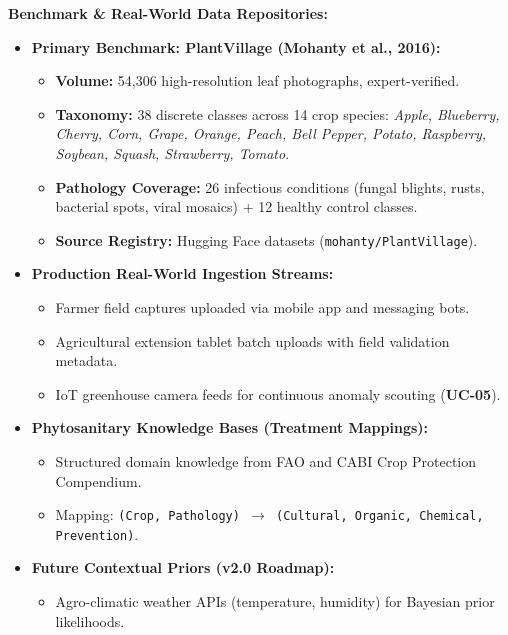 \documentclass[8pt]{article}
\begin{document}
\begin{minipage}[t]{0.327\linewidth}%
  \begin{tcolorbox}[
    canvasbox,
    colback=bgData,
    colframe=headData,
    title={2. DATA SOURCES},
    boxed title style={colback=headData},
    height=68mm
  ]
  \fontsize{7.2pt}{8.8pt}\selectfont
  \textbf{Benchmark \& Real-World Data Repositories:}
  \vspace{1mm}
  \begin{itemize}
    \item \textbf{Primary Benchmark: PlantVillage (Mohanty et al., 2016):}
      \begin{itemize}
        \item \textbf{Volume:} 54,306 high-resolution leaf photographs, expert-verified.
        \item \textbf{Taxonomy:} 38 discrete classes across 14 crop species:
          \emph{Apple, Blueberry, Cherry, Corn, Grape, Orange, Peach, Bell Pepper, Potato, Raspberry, Soybean, Squash, Strawberry, Tomato}.
        \item \textbf{Pathology Coverage:} 26 infectious conditions (fungal blights, rusts, bacterial spots, viral mosaics) + 12 healthy control classes.
        \item \textbf{Source Registry:} Hugging Face datasets (\texttt{mohanty/PlantVillage}).
      \end{itemize}
    \item \textbf{Production Real-World Ingestion Streams:}
      \begin{itemize}
        \item Farmer field captures uploaded via mobile app and messaging bots.
        \item Agricultural extension tablet batch uploads with field validation metadata.
        \item IoT greenhouse camera feeds for continuous anomaly scouting (\textbf{UC-05}).
      \end{itemize}
    \item \textbf{Phytosanitary Knowledge Bases (Treatment Mappings):}
      \begin{itemize}
        \item Structured domain knowledge from FAO and CABI Crop Protection Compendium.
        \item Mapping: \texttt{(Crop, Pathology) $\rightarrow$ (Cultural, Organic, Chemical, Prevention)}.
      \end{itemize}
    \item \textbf{Future Contextual Priors (v2.0 Roadmap):}
      \begin{itemize}
        \item Agro-climatic weather APIs (temperature, humidity) for Bayesian prior likelihoods.
      \end{itemize}
  \end{itemize}
  \end{tcolorbox}%
\end{minipage}\hfill%
\end{document}

